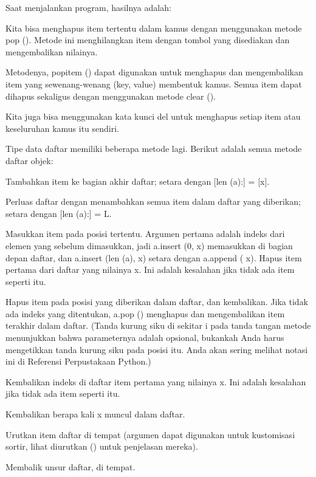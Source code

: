 Saat menjalankan program, hasilnya adalah: 

Kita bisa menghapus item tertentu dalam kamus dengan menggunakan metode pop (). Metode ini menghilangkan item dengan tombol yang disediakan dan mengembalikan nilainya. \par

Metodenya, popitem () dapat digunakan untuk menghapus dan mengembalikan item yang sewenang-wenang (key, value) membentuk kamus. Semua item dapat dihapus sekaligus dengan menggunakan metode clear (). \par

Kita juga bisa menggunakan kata kunci del untuk menghapus setiap item atau keseluruhan kamus itu sendiri. 

Tipe data daftar memiliki beberapa metode lagi. Berikut adalah semua metode daftar objek: 

Tambahkan item ke bagian akhir daftar; setara dengan [len (a):] = [x]. 

Perluas daftar dengan menambahkan semua item dalam daftar yang diberikan; setara dengan [len (a):] = L. 
 
Masukkan item pada posisi tertentu. Argumen pertama adalah indeks dari elemen yang sebelum dimasukkan, jadi a.insert (0, x) memasukkan di bagian depan daftar, dan a.insert (len (a), x) setara dengan a.append ( x). 
Hapus item pertama dari daftar yang nilainya x. Ini adalah kesalahan jika tidak ada item seperti itu. 
 
Hapus item pada posisi yang diberikan dalam daftar, dan kembalikan. Jika tidak ada indeks yang ditentukan, a.pop () menghapus dan mengembalikan item terakhir dalam daftar. (Tanda kurung siku di sekitar i pada tanda tangan metode menunjukkan bahwa parameternya adalah opsional, bukankah Anda harus mengetikkan tanda kurung siku pada posisi itu. Anda akan sering melihat notasi ini di Referensi Perpustakaan Python.) \par

Kembalikan indeks di daftar item pertama yang nilainya x. Ini adalah kesalahan jika tidak ada item seperti itu. 
 
Kembalikan berapa kali x muncul dalam daftar.

Urutkan item daftar di tempat (argumen dapat digunakan untuk kustomisasi sortir, lihat diurutkan () untuk penjelasan mereka).

Membalik unsur daftar, di tempat. 

